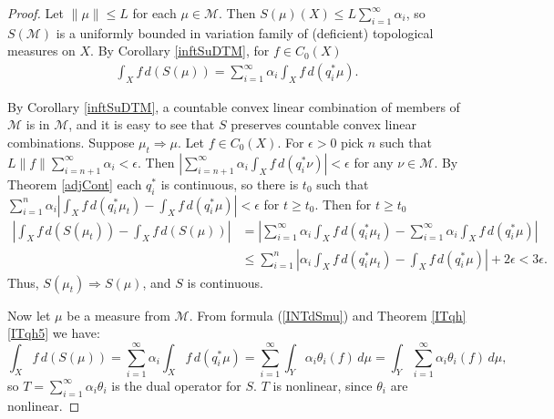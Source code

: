 \documentclass[10pt,a4paper]{amsart}
\begin{document}
\begin{proof}
Let  $ \| \mu \|  \le L$ for each $ \mu \in \mathcal{M}$. Then $S(\mu)(X) \le L  \sum_{i=1}^\infty \alpha_i $, 
so $S(\mathcal{M})$ is a uniformly bounded in variation family of (deficient) topological measures on $X$.
By Corollary \ref{inftSuDTM}, for $ f \in C_0(X)$ 
\begin{align} \label{INTdSmu}
 \int_X f \, d(S(\mu)) = \sum_{i=1}^\infty \alpha_i \int_X f \, d(q_i^* \mu).
\end{align}

By Corollary \ref{inftSuDTM},  a countable convex linear combination of members of $\mathcal{M}$ is in $\mathcal{M}$, 
and it is easy to see that $S$ preserves countable convex linear combinations. 
Suppose $ \mu_t \Longrightarrow \mu$. 
Let $ f \in C_0(X)$. For $ \epsilon >0$ pick $n$ such that 
$ L \| f \| \sum_{i=n+1}^{\infty} \alpha_i  < \epsilon$. 
Then $| \sum_{i=n+1}^\infty \alpha_i \int_X f \, d(q_i^* \nu)| < \epsilon$ for any $ \nu \in  \mathcal{M} $.
By Theorem \ref{adjCont} each  $q_i^*$ is continuous, so there is $ t_0$ such that 
$ \sum_{i=1}^n \alpha_i  |  \int_X f \, d(q_i^* \mu_t) -  \int_X f \, d(q_i^* \mu) | < \epsilon$ for $ t \ge t_0$.
Then for  $ t \ge t_0$
\begin{align*}
| \int_X f \, d(S(\mu_t)) -  \int_X f \, d(S(\mu)) | &= 
|\sum_{i=1}^{\infty} \alpha_i \int_X f \, d(q_i^*\mu_t) -  \sum_{i=1}^{\infty} \alpha_i \int_X f \, d(q_i^*\mu) | \\
& \le   \sum_{i=1}^n |  \alpha_i   \int_X f \, d(q_i^* \mu_t) -  \int_X f \, d(q_i^* \mu) | + 2 \epsilon < 3 \epsilon. 
\end{align*}
Thus,  $S( \mu_t) \Longrightarrow  S(\mu)$, and $S$ is continuous. 

Now let $ \mu$ be a measure from $\mathcal{M}$.
From formula (\ref{INTdSmu}) and Theorem \ref{ITqh}\ref{ITqh5} we have:
$$ \int_X f \, d(S(\mu)) = \sum_{i=1}^\infty \alpha_i \int_X f \, d(q_i^* \mu) =  \sum_{i=1}^\infty \int_Y  \alpha_i  \theta_i(f) \,  d\mu 
= \int_Y  \sum_{i=1}^\infty  \alpha_i  \theta_i(f) \,  d\mu,$$
so $ T= \sum_{i=1}^\infty \alpha_i \theta_i$ is the dual operator for $S$. $T$ is nonlinear, since $\theta_i$ are nonlinear. 
\end{proof}
\end{document}
